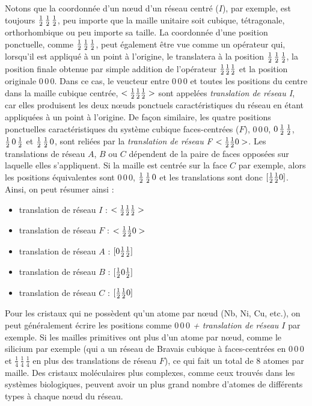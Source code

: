 Notons que la coordonnée d'un nœud d'un réseau centré ($I$), par exemple, est
toujours $\mbox{$\frac{1}{2}$}\,\mbox{$\frac{1}{2}$}\,\mbox{$\frac{1}{2}$}$, peu importe que la maille unitaire soit cubique,
tétragonale, orthorhombique ou peu importe sa taille. La coordonnée d'une
position ponctuelle, comme $\mbox{$\frac{1}{2}$}\,\mbox{$\frac{1}{2}$}\,\mbox{$\frac{1}{2}$}$, peut également être vue comme
un opérateur qui, lorsqu'il est appliqué à un point à l'origine, le translatera à
la position $\mbox{$\frac{1}{2}$}\,\mbox{$\frac{1}{2}$}\,\mbox{$\frac{1}{2}$}$, la position finale obtenue par simple addition
de l'opérateur $\mbox{$\frac{1}{2}$}\mbox{$\frac{1}{2}$}\mbox{$\frac{1}{2}$}$ et la position originale $0\,0\,0$. Dans ce cas,
le veucteur entre $0\,0\,0$ et toutes les positions du centre dans la maille
cubique centrée, \ie $<\mbox{$\frac{1}{2}$}\mbox{$\frac{1}{2}$}\mbox{$\frac{1}{2}$}>$ sont appelées \emph{translation de
réseau I}, car elles produisent les deux nœuds ponctuels caractéristiques
du réseau en étant appliquées à un point à l'origine. De façon similaire, les
quatre positions ponctuelles caractéristiques du système cubique faces-centrées
($F$), \ie $0\,0\,0$, $0\,\mbox{$\frac{1}{2}$}\,\mbox{$\frac{1}{2}$}$, $\mbox{$\frac{1}{2}$}\,0\,\mbox{$\frac{1}{2}$}$ et $\mbox{$\frac{1}{2}$}\,\mbox{$\frac{1}{2}$}\,0$,
sont reliées par la \emph{translation de réseau F} $<\mbox{$\frac{1}{2}$}\mbox{$\frac{1}{2}$} 0>$. Les
translations de réseau $A$, $B$ ou $C$  dépendent de la paire de faces opposées
sur laquelle elles s'appliquent. Si la maille est centrée sur la face $C$ par
exemple, alors les positions équivalentes sont $0\,0\,0$, $\mbox{$\frac{1}{2}$}\,\mbox{$\frac{1}{2}$}\,0$ et
les translations sont donc $[\mbox{$\frac{1}{2}$}\mbox{$\frac{1}{2}$} 0]$. Ainsi, on peut résumer ainsi :

\begin{itemize}
    \item translation de réseau $I$ : $<\mbox{$\frac{1}{2}$}\mbox{$\frac{1}{2}$}\mbox{$\frac{1}{2}$}>$
    \item translation de réseau $F$ : $<\mbox{$\frac{1}{2}$} \mbox{$\frac{1}{2}$} 0>$
    \item translation de réseau $A$ : $[0 \mbox{$\frac{1}{2}$} \mbox{$\frac{1}{2}$}]$
    \item translation de réseau $B$ : $[\mbox{$\frac{1}{2}$} 0 \mbox{$\frac{1}{2}$}]$
    \item translation de réseau $C$ : $[\mbox{$\frac{1}{2}$} \mbox{$\frac{1}{2}$} 0]$
\end{itemize}

Pour les cristaux qui ne possèdent qu'un atome par nœud (\ie Nb, Ni, Cu, etc.),
on peut généralement écrire les positions comme \emph{$0\,0\,0$ + translation de
réseau $I$} par exemple. Si les mailles primitives ont plus d'un atome par nœud,
comme le silicium par exemple (qui a un réseau de Bravais cubique à
faces-centrées en $0\,0\,0$ et $\frac{1}{4}\,\frac{1}{4}\,\frac{1}{4}$ en plus
des translations de réseau $F$), ce qui fait un total de 8 atomes par maille. Des
cristaux moléculaires plus complexes, comme ceux trouvés dans les systèmes
biologiques, peuvent avoir un plus grand nombre d'atomes de différents types à
chaque nœud du réseau.

